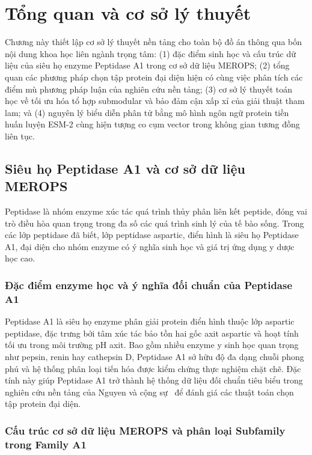 \chapter{Tổng quan và cơ sở lý thuyết}
\label{chap:theory}

Chương này thiết lập cơ sở lý thuyết nền tảng cho toàn bộ đồ án thông qua bốn nội dung khoa học liên ngành trọng tâm: (1) đặc điểm sinh học và cấu trúc dữ liệu của siêu họ enzyme Peptidase A1 trong cơ sở dữ liệu MEROPS; (2) tổng quan các phương pháp chọn tập protein đại diện hiện có cùng việc phân tích các điểm mù phương pháp luận của nghiên cứu nền tảng; (3) cơ sở lý thuyết toán học về tối ưu hóa tổ hợp submodular và bảo đảm cận xấp xỉ của giải thuật tham lam; và (4) nguyên lý biểu diễn phân tử bằng mô hình ngôn ngữ protein tiền huấn luyện ESM-2 cùng hiện tượng co cụm vector trong không gian tương đồng liên tục.

\section{Siêu họ Peptidase A1 và cơ sở dữ liệu MEROPS}
\label{sec:theory_merops_a1a}

Peptidase là nhóm enzyme xúc tác quá trình thủy phân liên kết peptide, đóng vai trò điều hòa quan trọng trong đa số các quá trình sinh lý của tế bào sống. Trong các lớp peptidase đã biết, lớp peptidase aspartic, điển hình là siêu họ Peptidase A1, đại diện cho nhóm enzyme có ý nghĩa sinh học và giá trị ứng dụng y dược học cao.

\subsection{Đặc điểm enzyme học và ý nghĩa đối chuẩn của Peptidase A1}
\label{subsec:aspartic_peptidase}

Peptidase A1 là siêu họ enzyme phân giải protein điển hình thuộc lớp aspartic peptidase, đặc trưng bởi tâm xúc tác bảo tồn hai gốc axit aspartic và hoạt tính tối ưu trong môi trường pH axit. Bao gồm nhiều enzyme y sinh học quan trọng như pepsin, renin hay cathepsin D, Peptidase A1 sở hữu độ đa dạng chuỗi phong phú và hệ thống phân loại tiến hóa được kiểm chứng thực nghiệm chặt chẽ. Đặc tính này giúp Peptidase A1 trở thành hệ thống dữ liệu đối chuẩn tiêu biểu trong nghiên cứu nền tảng của Nguyen và cộng sự~\cite{nguyen2025} để đánh giá các thuật toán chọn tập protein đại diện.

\subsection{Cấu trúc cơ sở dữ liệu MEROPS và phân loại Subfamily trong Family A1}
\label{subsec:merops_database}

